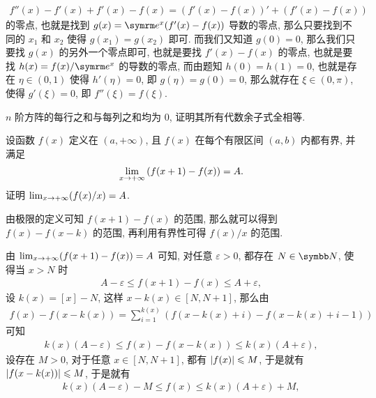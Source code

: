 \begin{exercise}[series=exer]
\begin{answer}
        \begin{align*}
            f''(x) - f'(x) + f'(x) - f(x) = (f'(x) - f(x))' + (f'(x) - f(x))
        \end{align*}
        的零点, 也就是找到 $ g(x) = \me^{x}(f'(x) - f(x)) $ 导数的零点, 那么只要找到不同的 $ x_{1} $ 和 $ x_{2} $ 使得 $ g(x_{1}) = g(x_{2}) $ 即可. 而我们又知道 $ g(0) = 0 $, 那么我们只要找 $ g(x) $ 的另外一个零点即可, 也就是要找 $ f'(x) - f(x) $ 的零点, 也就是要找 $ h(x) = f(x)/\me^{x} $ 的导数的零点, 而由题知 $ h(0) = h(1) = 0 $, 也就是存在 $ \eta\in(0, 1) $ 使得 $ h'(\eta) = 0 $, 即 $ g(\eta) = g(0) = 0 $, 那么就存在 $ \xi \in (0, \pi) $, 使得 $ g'(\xi) = 0 $, 即 $ f''(\xi) = f(\xi) $. 
    \end{answer}
    \item $ n $ 阶方阵的每行之和与每列之和均为 0, 证明其所有代数余子式全相等.
    \item 设函数 $ f(x) $ 定义在 $ (a, +\infty) $, 且 $ f(x) $ 在每个有限区间 $ (a, b) $ 内都有界, 并满足
    \begin{align*}
        \lim_{x \to +\infty} \qty(f(x + 1) - f(x)) = A.
    \end{align*}
    证明 $ \lim_{x \to +\infty} (f(x) / x) = A $. 
    \begin{hint}
        由极限的定义可知 $ f(x + 1) - f(x) $ 的范围, 那么就可以得到 $ f(x) - f(x - k) $ 的范围, 再利用有界性可得 $ f(x)/x $ 的范围. 
    \end{hint}
    \begin{answer}
        由 $ \lim_{x \to +\infty} (f(x + 1) - f(x)) = A $ 可知, 对任意 $ \varepsilon > 0 $, 都存在 $ N \in \N $, 使得当 $ x > N $ 时
        \begin{align*}
            A - \varepsilon \le f(x + 1) - f(x) \le A + \varepsilon,
        \end{align*}
        设 $ k(x) = [x] - N $, 这样 $ x - k(x) \in [N, N + 1] $, 那么由
        \begin{align*}
            f(x) - f(x - k(x)) = \sum_{i = 1}^{k(x)}(f(x - k(x) + i) - f(x - k(x) + i - 1))
        \end{align*} 
        可知
        \begin{align*}
            k(x)(A - \varepsilon) \le f(x) - f(x - k(x)) \le k(x)(A + \varepsilon),
        \end{align*}
        设存在 $ M > 0 $, 对于任意 $ x \in [N, N + 1] $, 都有 $ \abs{f(x)} \leqslant M $, 于是就有 $ \abs{f(x - k(x))} \leqslant M $, 于是就有
        \begin{align*}
            k(x)(A - \varepsilon) - M \le f(x) \le k(x)(A + \varepsilon) + M,

\end{align*}
\end{answer}
\end{exercise}

